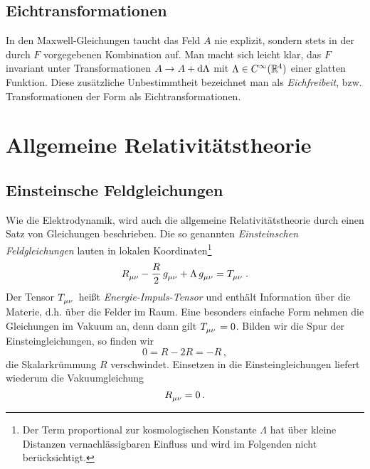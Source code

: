 \subsection{Eichtransformationen}
In den Maxwell-Gleichungen taucht das Feld $A$ nie explizit, sondern stets in
der durch $F$ vorgegebenen Kombination auf. Man macht sich leicht klar, das $F$
invariant unter Transformationen $A\to A+\dif\Lambda$ mit $\Lambda\in
C^\infty(\mathbb{R}^4)$ einer glatten Funktion. Diese zusätzliche Unbestimmtheit
bezeichnet man als \emph{Eichfreibeit}, bzw. Transformationen der Form als
Eichtransformationen. 
\section{Allgemeine Relativitätstheorie}
\subsection{Einsteinsche Feldgleichungen}
Wie die Elektrodynamik, wird auch die allgemeine Relativitätstheorie durch einen
Satz von Gleichungen beschrieben. Die so genannten \emph{Einsteinschen
Feldgleichungen} lauten in lokalen Koordinaten\footnote{Der Term proportional
zur kosmologischen Konstante $\Lambda$ hat über kleine Distanzen vernachlässigbaren Einfluss und wird im Folgenden nicht berücksichtigt.}
\begin{equation}
\tensor{R}{_\mu_\nu} - \frac{R}{2}\, \tensor{g}{_\mu_\nu}
+\Lambda\, \tensor{g}{_\mu_\nu}
=\tensor{T}{_\mu_\nu}\,.
\end{equation}
Der Tensor $\tensor{T}{_\mu_\nu}$ heißt \emph{Energie-Impuls-Tensor} und
enthält Information über die Materie, d.h. über die Felder im Raum. Eine
besonders einfache Form nehmen die Gleichungen im Vakuum an, denn dann gilt 
$\tensor{T}{_\mu_\nu}=0$.
Bilden wir die Spur der Einsteingleichungen, so finden wir 
\begin{equation}
0=R- 2 R =-R\,,
\end{equation}
die Skalarkrümmung $R$ verschwindet.
Einsetzen in die Einsteingleichungen liefert wiederum die Vakuumgleichung
\begin{equation}
\tensor{R}{_\mu_\nu}=0\,.
\end{equation}
